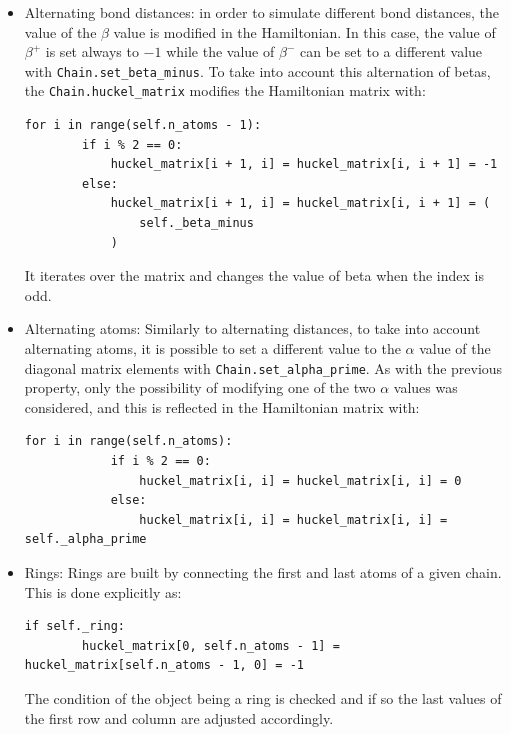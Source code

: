 \documentclass{article}
\begin{document}
\begin{itemize}
    \item Alternating bond distances: in order to simulate different bond distances, the value of the \(\beta\) value is modified in the Hamiltonian. In this case, the value of \(\beta^+\) is set always to \(-1\) while the value of \(\beta^-\) can be set to a different value with \texttt{Chain.set\_beta\_minus}. To take into account this alternation of betas, the \texttt{Chain.huckel\_matrix} modifies the Hamiltonian matrix with:
\begin{lstlisting}[backgroundcolor=\color{LightGray}]
    for i in range(self.n_atoms - 1):
        if i % 2 == 0:
            huckel_matrix[i + 1, i] = huckel_matrix[i, i + 1] = -1
        else:
            huckel_matrix[i + 1, i] = huckel_matrix[i, i + 1] = (
                self._beta_minus
            )
\end{lstlisting} 
    It iterates over the matrix and changes the value of beta when the index is odd. 
    \item Alternating atoms: Similarly to alternating distances, to take into account alternating atoms, it is possible to set a different value to the $\alpha$ value of the diagonal matrix elements with \texttt{Chain.set\_alpha\_prime}. As with the previous property, only the possibility of modifying one of the two $\alpha$ values was considered, and this is reflected in the Hamiltonian matrix with:
\begin{lstlisting}[backgroundcolor=\color{LightGray}]
        for i in range(self.n_atoms):
            if i % 2 == 0:
                huckel_matrix[i, i] = huckel_matrix[i, i] = 0
            else:
                huckel_matrix[i, i] = huckel_matrix[i, i] = self._alpha_prime
\end{lstlisting} 
    
    \item Rings: Rings are built by connecting the first and last atoms of a given chain. This is done explicitly as:
\begin{lstlisting}[backgroundcolor=\color{LightGray}]
    if self._ring:
        huckel_matrix[0, self.n_atoms - 1] = huckel_matrix[self.n_atoms - 1, 0] = -1
\end{lstlisting} 
The condition of the object being a ring is checked and if so the last values of the first row and column are adjusted accordingly. 
        
\end{itemize}
\end{document}
